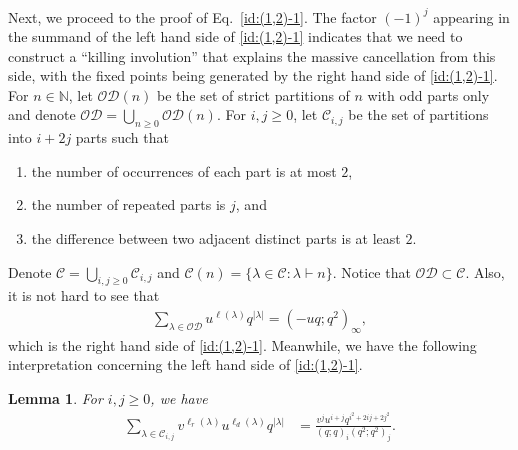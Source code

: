 \documentclass[11pt,reqno]{amsart}
\numberwithin{equation}{section}
\theoremstyle{plain}
\newtheorem{lemma}[theorem]{Lemma}
\theoremstyle{definition}
\newcommand{\abs}[1]{\left|#1\right|}
\def\la{\lambda}
\def\C{\mathcal{C}}
\def\N{\mathbb{N}}
\def\O{\mathcal{O}}
\newcommand{\D}{\mathcal{D}}
\begin{document}
Next, we proceed to the proof of Eq.~\eqref{id:(1,2)-1}. The factor $(-1)^j$ appearing in the summand of the left hand side of \eqref{id:(1,2)-1} indicates that we need to construct a ``killing involution'' that explains the massive cancellation from this side, with the fixed points being generated by the right hand side of \eqref{id:(1,2)-1}. For $n\in \N$, let $\O\D(n)$ be the set of strict partitions of $n$ with odd parts only and denote $\O\D=\bigcup_{n\geq 0}\O\D(n)$. For $i, j\geq 0$, let $\C_{i, j}$ be the set of partitions into $i+2j$ parts such that 
\begin{enumerate}[(1)]
    \item the number of occurrences of each part is at most $2$,
    \item the number of repeated parts is $j$, and
    \item the difference between two adjacent distinct parts is at least $2$. 
\end{enumerate}
Denote $\C=\bigcup_{i, j\geq 0}\C_{i, j}$ and $\C(n)=\{\la\in \C: \la\vdash n\}$. Notice that $\O\D\subset\C$. Also, it is not hard to see that
\begin{align}\label{gf:OD}
\sum_{\la\in\O\D}u^{\ell(\la)}q^{\abs{\la}}=(-uq;q^2)_\infty,
\end{align}
which is the right hand side of \eqref{id:(1,2)-1}. Meanwhile, we have the following interpretation concerning the left hand side of \eqref{id:(1,2)-1}.
\begin{lemma}
For $i,j\ge 0$, we have
\begin{align}\label{gf:C_ij}
\sum_{\la\in\C_{i,j}}v^{\ell_r(\la)}u^{\ell_d(\la)}q^{\abs{\la}} &=\frac{v^{j}u^{i+j}q^{i^2+2ij+2j^2}}{(q;q)_{i}(q^2;q^2)_{j}}.
\end{align}
\end{lemma}
\end{document}
